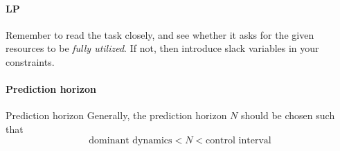 
\paragraph{LP}
Remember to read the task closely, and see whether it asks for the given resources to be \textit{fully utilized}. If not, then introduce slack variables in your constraints.

\paragraph{Prediction horizon}{Prediction horizon} Generally, the prediction horizon $N$ should be chosen such that
\begin{equation}
    \text{dominant dynamics} < N < \text{control interval}
\end{equation}